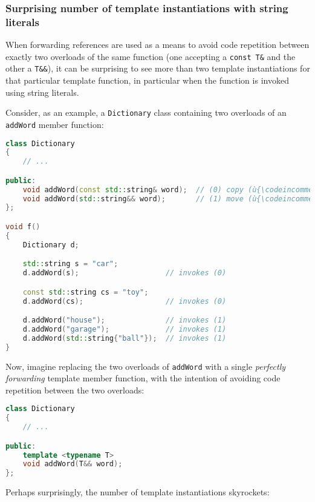 \subsubsection[Surprising number of template instantiations with string literals]{Surprising number of template instantiations with string literals}\label{surprising-number-of-template-instantiations-with-string-literals}

When forwarding references are used as a means to avoid code repetition
between exactly two overloads of the same function (one accepting a
\texttt{const}~\texttt{T\&} and the other a \texttt{T\&\&}), it can be
surprising to see more than two template instantiations for that
particular template function, in particular when the function is invoked
using string literals.

Consider, as an example, a \texttt{Dictionary} class containing two
overloads of an \texttt{addWord} member function:

\begin{lstlisting}[language=C++]
class Dictionary
{
    // ...

public:
    void addWord(const std::string& word);  // (0) copy (ù{\codeincomments{word}}ù) in the dictionary
    void addWord(std::string&& word);       // (1) move (ù{\codeincomments{word}}ù) in the dictionary
};

void f()
{
    Dictionary d;

    std::string s = "car";
    d.addWord(s);                    // invokes (0)

    const std::string cs = "toy";
    d.addWord(cs);                   // invokes (0)

    d.addWord("house");              // invokes (1)
    d.addWord("garage");             // invokes (1)
    d.addWord(std::string{"ball"});  // invokes (1)
}
\end{lstlisting}
    
\noindent Now, imagine replacing the two overloads of \texttt{addWord} with a
single \textit{perfectly forwarding} template member function, with the intention
of avoiding code repetition between the two overloads:

\begin{lstlisting}[language=C++]
class Dictionary
{
    // ...

public:
    template <typename T>
    void addWord(T&& word);
};
\end{lstlisting}
    
\noindent Perhaps surprisingly, the number of template instantiations skyrockets:

